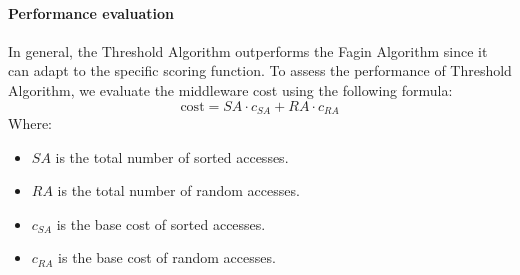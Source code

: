 \paragraph*{Performance evaluation}
In general, the Threshold Algorithm outperforms the Fagin Algorithm since it can adapt to the specific scoring function. 
To assess the performance of Threshold Algorithm, we evaluate the middleware cost using the following formula:
\[\text{cost} = SA \cdot c_{SA} + RA \cdot c_{RA}\]
Where:
\begin{itemize}
    \item $SA$ is the total number of sorted accesses.
    \item $RA$ is the total number of random accesses.
    \item $c_{SA}$ is the base cost of sorted accesses.
    \item $c_{RA}$ is the base cost of random accesses.
\end{itemize}

